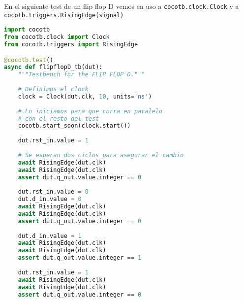 \documentclass[a4paper,12pt]{article}
\begin{document}
En el siguiente test de un flip flop D vemos en uso a \texttt{cocotb.clock.Clock} y a \texttt{cocotb.triggers.RisingEdge(signal)}
\begin{lstlisting}[language=Python, caption=flipflopd\_tb.py, frame=lines]
import cocotb
from cocotb.clock import Clock
from cocotb.triggers import RisingEdge

@cocotb.test()
async def flipflopD_tb(dut):
	"""Testbench for the FLIP FLOP D."""
	
	# Definimos el clock
	clock = Clock(dut.clk, 10, units='ns')
	
	# Lo iniciamos para que corra en paralelo 
	# con el resto del test
	cocotb.start_soon(clock.start())
	
	dut.rst_in.value = 1
	
	# Se esperan dos ciclos para asegurar el cambio
	await RisingEdge(dut.clk)
	await RisingEdge(dut.clk) 
	assert dut.q_out.value.integer == 0
	
	dut.rst_in.value = 0
	dut.d_in.value = 0
	await RisingEdge(dut.clk)
	await RisingEdge(dut.clk)
	assert dut.q_out.value.integer == 0
	
	dut.d_in.value = 1
	await RisingEdge(dut.clk)
	await RisingEdge(dut.clk)
	assert dut.q_out.value.integer == 1
	
	dut.rst_in.value = 1
	await RisingEdge(dut.clk)
	await RisingEdge(dut.clk)
	assert dut.q_out.value.integer == 0
\end{lstlisting}
\end{document}
